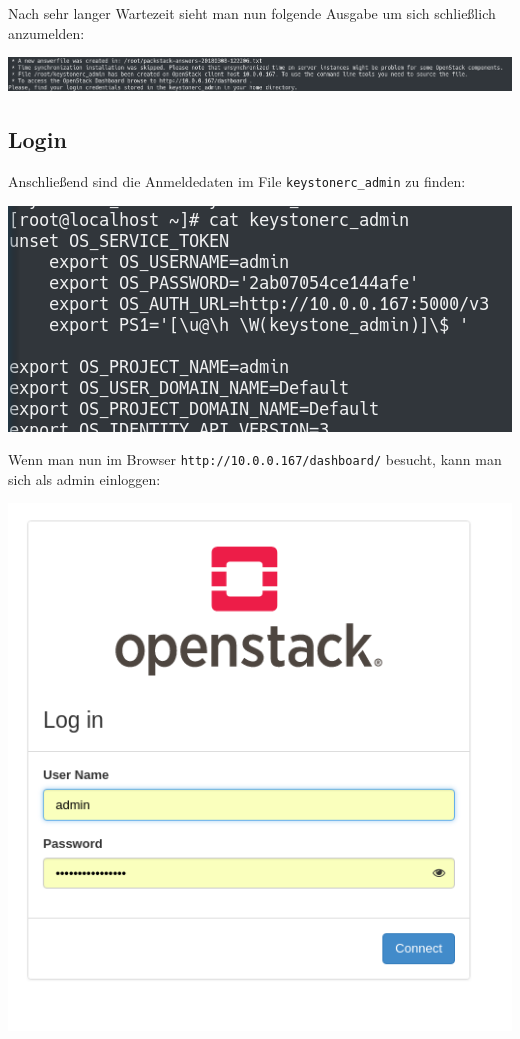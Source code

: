 Nach sehr langer Wartezeit sieht man nun folgende Ausgabe um sich schließlich anzumelden:

\begin{minipage}{\linewidth}
	\centering
	\includegraphics[width=1\linewidth]{images/packstackdone}
\end{minipage}

\subsection{Login}
Anschließend sind die Anmeldedaten im File \verb|keystonerc_admin| zu finden:

\begin{minipage}{\linewidth}
	\centering
	\includegraphics[width=.8\linewidth]{images/keystore}
\end{minipage}

Wenn man nun im Browser \verb|http://10.0.0.167/dashboard/| besucht, kann man sich als admin einloggen:

\begin{minipage}{\linewidth}
	\centering
	\includegraphics[width=.5\linewidth]{images/login}
\end{minipage}


